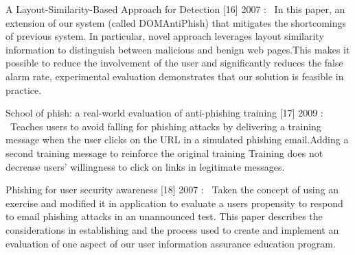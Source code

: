 \hspace{.2cm} A Layout-Similarity-Based Approach for Detection
[16] 2007 :  In this paper, an extension of our system (called DOMAntiPhish) that mitigates the shortcomings of previous system. In particular, novel approach leverages layout similarity information to distinguish between malicious and benign web pages.This makes it possible to reduce the involvement of the user and significantly reduces the false alarm rate, experimental evaluation demonstrates that our solution is feasible in practice.

\hspace{.2cm} School of phish: a real-world evaluation of anti-phishing training
[17] 2009 :  Teaches users to avoid falling for phishing attacks by delivering a training message when the user clicks on the URL in a simulated phishing email.Adding a second training message to reinforce the original training
Training does not decrease users' willingness to click on links in legitimate messages.

\hspace{.2cm} Phishing for user security awareness
[18] 2007 :  Taken the concept of using an exercise and modified it in application to evaluate a users propensity to respond to email phishing attacks in an unannounced test.
This paper describes the considerations in establishing and the process used to create and implement an evaluation of one aspect of our user information assurance education program.






















 













